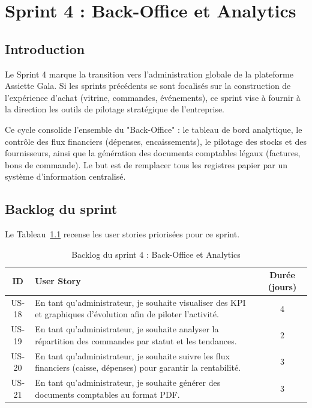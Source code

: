 ﻿%
\chapter{Sprint 4 : Back-Office et Analytics}

\section{Introduction}

Le Sprint 4 marque la transition vers l'administration globale de la plateforme Assiette Gala. Si les sprints précédents se sont focalisés sur la construction de l'expérience d'achat (vitrine, commandes, événements), ce sprint vise à fournir à la direction les outils de pilotage stratégique de l'entreprise. 

Ce cycle consolide l'ensemble du "Back-Office" : le tableau de bord analytique, le contrôle des flux financiers (dépenses, encaissements), le pilotage des stocks et des fournisseurs, ainsi que la génération des documents comptables légaux (factures, bons de commande). Le but est de remplacer tous les registres papier par un système d'information centralisé.

\section{Backlog du sprint}

Le Tableau~\ref{tab:backlog_sprint4_admin} recense les user stories priorisées pour ce sprint.

\begin{table}[H]
    \centering
    \caption{Backlog du sprint 4 : Back-Office et Analytics}
    \label{tab:backlog_sprint4_admin}
    \renewcommand{\arraystretch}{1.3}
    \begin{tabular}{|c|p{8.5cm}|c|}
        \hline
        \textbf{ID} & \textbf{User Story} & \textbf{Durée (jours)} \\
        \hline
        US-18 & En tant qu'administrateur, je souhaite visualiser des KPI et graphiques d'évolution afin de piloter l'activité. & 4 \\
        \hline
        US-19 & En tant qu'administrateur, je souhaite analyser la répartition des commandes par statut et les tendances. & 2 \\
        \hline
        US-20 & En tant qu'administrateur, je souhaite suivre les flux financiers (caisse, dépenses) pour garantir la rentabilité. & 3 \\
        \hline
        US-21 & En tant qu'administrateur, je souhaite générer des documents comptables au format PDF. & 3 \\
        \hline
    \end{tabular}
\end{table}

